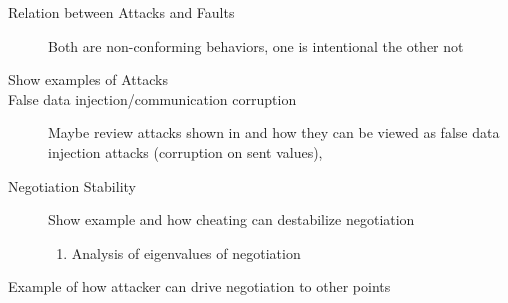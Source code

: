 \documentclass[../main.tex]{subfiles}
\begin{document}
\begin{description}
  \item[Relation between Attacks and Faults] Both are non-conforming behaviors, one is intentional the other not
  \item[Show examples of Attacks]
  \item[False data injection/communication corruption] Maybe review attacks shown in \cite{VelardeEtAl2017} and how they can be viewed as false data injection attacks (corruption on sent values), 
  \item[Negotiation Stability] Show example and how cheating can destabilize negotiation
        \begin{enumerate}
          \item Analysis of eigenvalues of negotiation
        \end{enumerate}
  \item[Example of how attacker can drive negotiation to other points]
\end{description}
\end{document}
